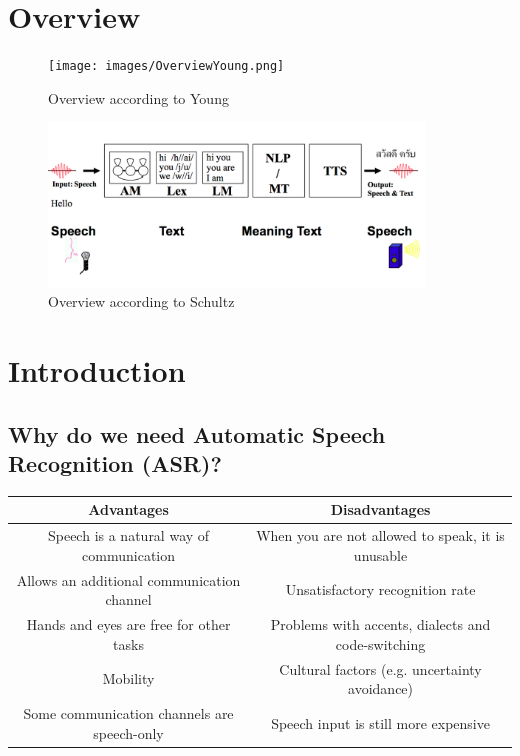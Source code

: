 
\section{Overview}

\begin{figure}[ht]
\centering
\texttt{[image: images/OverviewYoung.png]}
\caption{Overview according to Young}
\label{fig:overviewYoung}
\end{figure}

\begin{figure}[ht]
\centering
\includegraphics[width=10cm]{images/OverviewSchultz.png}
\caption{Overview according to Schultz}
\label{fig:overviewSchultz}
\end{figure}

\newpage

\section{Introduction}

\subsection{Why do we need Automatic Speech Recognition (ASR)?}

\begin{center}
  \begin{tabular}{ c | c }
    \hline
    Advantages & Disadvantages  \\ \hline
    Speech is a natural way of communication & When you are not allowed to speak, it is unusable   \\
    Allows an additional communication channel   & Unsatisfactory recognition rate  \\
    Hands and eyes are free for other tasks & Problems with accents, dialects and code-switching   \\
    Mobility & Cultural factors (e.g. uncertainty avoidance)   \\
    Some communication channels are speech-only & Speech input is still more expensive   \\
    \hline
  \end{tabular}
\end{center}

